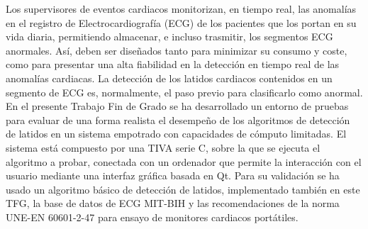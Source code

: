 Los supervisores de eventos cardiacos monitorizan, en tiempo real, las anomalías en el registro de Electrocardiografía (ECG) de los pacientes que los portan en su vida diaria, permitiendo almacenar, e incluso trasmitir, los segmentos ECG anormales. Así, deben ser diseñados tanto para minimizar su consumo y coste, como para presentar una alta fiabilidad en la detección en tiempo real de las anomalías cardiacas. La detección de los latidos cardiacos contenidos en un segmento de ECG es, normalmente, el paso previo para clasificarlo como anormal. En el presente Trabajo Fin de Grado se ha desarrollado un entorno de pruebas para evaluar de una forma realista el desempeño de los algoritmos de detección de latidos en un sistema empotrado con capacidades de cómputo limitadas.  El sistema está compuesto por una TIVA serie C, sobre la que se ejecuta el algoritmo a probar, conectada con un ordenador que permite la interacción con el usuario mediante una interfaz gráfica basada en Qt. Para su validación se ha usado un algoritmo básico de detección de latidos, implementado también en este TFG, la base de datos de ECG MIT-BIH y las recomendaciones de la norma UNE-EN 60601-2-47 para ensayo de monitores cardiacos portátiles.


\blankpage
